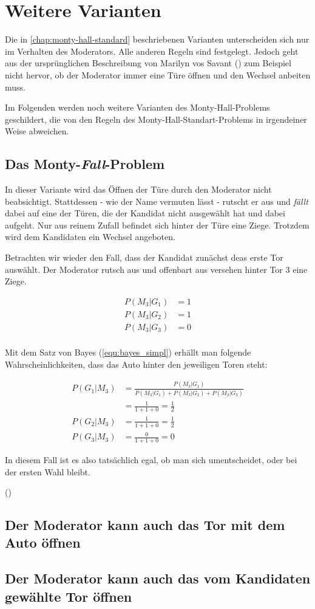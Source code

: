 
\chapter{Weitere Varianten}

Die in \autoref{chap:monty-hall-standard} beschriebenen Varianten unterscheiden sich nur im Verhalten des Moderators. Alle anderen Regeln sind festgelegt.
Jedoch geht aus der ursprünglichen Beschreibung von Marilyn vos Savant (\cite{Savant:1990}) zum Beispiel nicht hervor, ob der Moderator immer eine Türe öffnen und den Wechsel anbeiten muss.

Im Folgenden werden noch weitere Varianten des Monty-Hall-Problems geschildert, die von den Regeln des Monty-Hall-Standart-Problems in irgendeiner Weise abweichen.

\section{Das Monty-\textit{Fall}-Problem}

In dieser Variante wird das Öffnen der Türe durch den Moderator nicht beabsichtigt. Stattdessen - wie der Name vermuten lässt - rutscht er aus und \textit{fällt} dabei auf eine der Türen, die der Kandidat nicht ausgewählt hat und dabei aufgeht. Nur aus reinem Zufall befindet sich hinter der Türe eine Ziege. Trotzdem wird dem Kandidaten ein Wechsel angeboten.

Betrachten wir wieder den Fall, dass der Kandidat zunächst deas erste Tor auswählt. Der Moderator rutsch aus und offenbart aus versehen hinter Tor 3 eine Ziege.

\begin{equation*}
    \begin{split}
        P(M_3|G_1) &= 1 \\
        P(M_3|G_2) &= 1 \\
        P(M_3|G_3) &= 0 \\
    \end{split}
\end{equation*}

Mit dem Satz von Bayes (\autoref{equ:bayes_simpl}) erhällt man folgende Wahrscheinlichkeiten, dass das Auto hinter den jeweiligen Toren steht:

\begin{equation}
    \begin{split}
        P(G_1|M_3) & = \frac{P(M_3|G_1)}{P(M_3|G_1) + P(M_3|G_2) + P(M_3|G_3)} \\
        & = \frac{1}{1+1+0} = \frac{1}{2} \\
        P(G_2|M_3) & = \frac{1}{1+1+0} = \frac{1}{2} \\
        P(G_3|M_3) & = \frac{0}{1+1+0} = 0
    \end{split}
\end{equation}

In diesem Fall ist es also tatsächlich egal, ob man sich umentscheidet, oder bei der ersten Wahl bleibt.

(\cite{Rosenthal:2008})

\section{Der Moderator kann auch das Tor mit dem Auto öffnen}
\section{Der Moderator kann auch das vom Kandidaten gewählte Tor öffnen}
